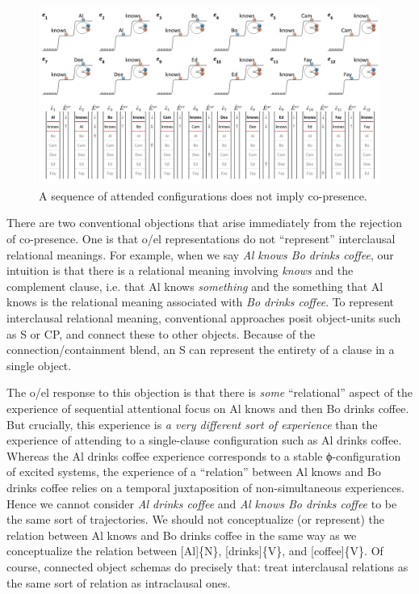   
\begin{figure}
\includegraphics[width=\textwidth]{figures/Tilsen-img106.png}
\caption{A sequence of attended configurations does not imply co-presence.}
\label{fig:5:2}
\end{figure}
 

  There are two conventional objections that arise immediately from the rejection of co-presence. One is that o/el representations do not “represent” interclausal relational meanings. For example, when we say \textit{Al knows Bo drinks coffee}, our intuition is that there is a relational meaning involving \textit{knows} and the complement clause, i.e. that Al knows \textit{something} and the something that Al knows is the relational meaning associated with \textit{Bo drinks coffee}. To represent interclausal relational meaning, conventional approaches posit object-units such as S or CP, and connect these to other objects. Because of the connection/containment blend, an S can represent the entirety of a clause in a single object. 

  The o/el response to this objection is that there is \textit{some} “relational” aspect of the experience of sequential attentional focus on {\textbar}Al knows{\textbar} and then {\textbar}Bo drinks coffee{\textbar}. But crucially, this experience is \textit{a very different sort of experience} than the experience of attending to a single-clause configuration such as {\textbar}Al drinks coffee{\textbar}. Whereas the {\textbar}Al drinks coffee{\textbar} experience corresponds to a stable ϕ-configuration of excited systems, the experience of a “relation” between {\textbar}Al knows{\textbar} and {\textbar}Bo drinks coffee{\textbar} relies on a temporal juxtaposition of non-simultaneous experiences. Hence we cannot consider \textit{Al drinks coffee} and \textit{Al knows Bo drinks coffee} to be the same sort of trajectories. We should not conceptualize (or represent) the relation between {\textbar}Al knows{\textbar} and {\textbar}Bo drinks coffee{\textbar} in the same way as we conceptualize the relation between [Al]\{N\}, [drinks]\{V\}, and [coffee]\{V\}. Of course, connected object schemas do precisely that: treat interclausal relations as the same sort of relation as intraclausal ones.

